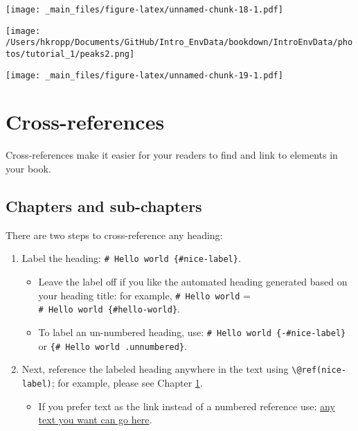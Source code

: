 \documentclass[
]{book}
\providecommand{\tightlist}{%
  \setlength{\itemsep}{0pt}\setlength{\parskip}{0pt}}
\theoremstyle{definition}
\theoremstyle{definition}
\theoremstyle{definition}
\theoremstyle{definition}
\theoremstyle{remark}
\begin{document}
\texttt{[image: \_main\_files/figure-latex/unnamed-chunk-18-1.pdf]}

\texttt{[image: /Users/hkropp/Documents/GitHub/Intro\_EnvData/bookdown/IntroEnvData/photos/tutorial\_1/peaks2.png]}

\texttt{[image: \_main\_files/figure-latex/unnamed-chunk-19-1.pdf]}

\hypertarget{cross}{%
\chapter{Cross-references}\label{cross}}

Cross-references make it easier for your readers to find and link to elements in your book.

\hypertarget{chapters-and-sub-chapters}{%
\section{Chapters and sub-chapters}\label{chapters-and-sub-chapters}}

There are two steps to cross-reference any heading:

\begin{enumerate}
\def\labelenumi{\arabic{enumi}.}
\tightlist
\item
  Label the heading: \texttt{\#\ Hello\ world\ \{\#nice-label\}}.

  \begin{itemize}
  \tightlist
  \item
    Leave the label off if you like the automated heading generated based on your heading title: for example, \texttt{\#\ Hello\ world} = \texttt{\#\ Hello\ world\ \{\#hello-world\}}.
  \item
    To label an un-numbered heading, use: \texttt{\#\ Hello\ world\ \{-\#nice-label\}} or \texttt{\{\#\ Hello\ world\ .unnumbered\}}.
  \end{itemize}
\item
  Next, reference the labeled heading anywhere in the text using \texttt{\textbackslash{}@ref(nice-label)}; for example, please see Chapter \ref{cross}.

  \begin{itemize}
  \tightlist
  \item
    If you prefer text as the link instead of a numbered reference use: \protect\hyperlink{cross}{any text you want can go here}.
  \end{itemize}
\end{enumerate}
\end{document}

